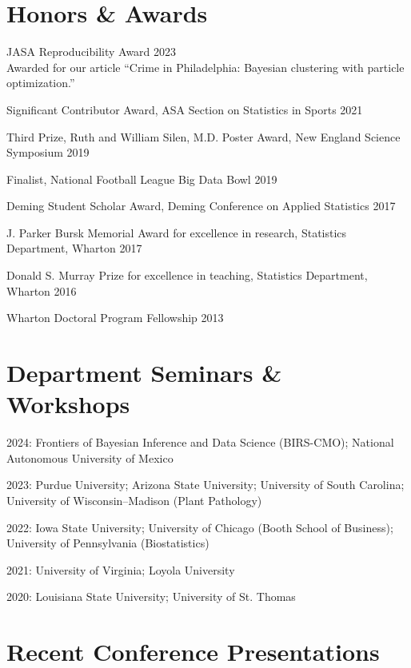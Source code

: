 \documentclass[10pt]{article}
\renewenvironment{itemize}{
  \begin{list}{}{
    \setlength{\leftmargin}{1.5em}
  }
}{
  \end{list}
}
\begin{document}
\section*{Honors \& Awards}
\begin{itemize}
\item{JASA Reproducibility Award \hfill 2023 \\
Awarded for our article ``Crime in Philadelphia: Bayesian clustering with particle optimization.''}
\item{Significant Contributor Award, ASA Section on Statistics in Sports \hfill 2021}
\item{Third Prize, Ruth and William Silen, M.D. Poster Award, New England Science Symposium \hfill 2019}
\item{Finalist, National Football League Big Data Bowl \hfill 2019}
\item{Deming Student Scholar Award, Deming Conference on Applied Statistics \hfill 2017}
\item{J. Parker Bursk Memorial Award for excellence in research, Statistics Department, Wharton \hfill  2017}
\item{Donald S. Murray Prize for excellence in teaching, Statistics Department, Wharton \hfill 2016}
\item{Wharton Doctoral Program Fellowship \hfill 2013}
\end{itemize}


\section*{Department Seminars \& Workshops}

\begin{itemize}
\item{2024: Frontiers of Bayesian Inference and Data Science (BIRS-CMO); National Autonomous University of Mexico}
\item{2023: Purdue University; Arizona State University; University of South Carolina; University of Wisconsin--Madison (Plant Pathology)}
\item{2022: Iowa State University; University of Chicago (Booth School of Business); University of Pennsylvania (Biostatistics)}
\item{2021: University of Virginia; Loyola University}
\item{2020: Louisiana State University; University of St. Thomas}
\end{itemize}


\section*{Recent Conference Presentations}
\end{document}
